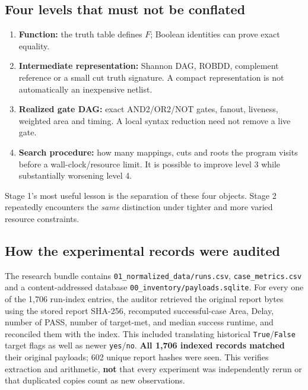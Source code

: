 \subsection{Four levels that must not be conflated}\label{four-levels-that-must-not-be-conflated}

\begin{enumerate}
\def\labelenumi{\arabic{enumi}.}
\tightlist
\item
  \textbf{Function:} the truth table defines \(F\); Boolean identities can prove exact equality.
\item
  \textbf{Intermediate representation:} Shannon DAG, ROBDD, complement reference or a small cut truth signature. A compact representation is not automatically an inexpensive netlist.
\item
  \textbf{Realized gate DAG:} exact AND2/OR2/NOT gates, fanout, liveness, weighted area and timing. A local syntax reduction need not remove a live gate.
\item
  \textbf{Search procedure:} how many mappings, cuts and roots the program visits before a wall-clock/resource limit. It is possible to improve level 3 while substantially worsening level 4.
\end{enumerate}

Stage 1's most useful lesson is the separation of these four objects. Stage 2 repeatedly encounters the \emph{same} distinction under tighter and more varied resource constraints.

\subsection{How the experimental records were audited}\label{how-the-experimental-records-were-audited}

The research bundle contains \texttt{01\_normalized\_data/runs.csv}, \texttt{case\_metrics.csv} and a content-addressed database \texttt{00\_inventory/payloads.sqlite}. For every one of the 1,706 run-index entries, the auditor retrieved the original report bytes using the stored report SHA-256, recomputed successful-case Area, Delay, number of PASS, number of target-met, and median success runtime, and reconciled them with the index. This included translating historical \texttt{True}/\texttt{False} target flags as well as newer \texttt{yes}/\texttt{no}. \textbf{All 1,706 indexed records matched} their original payloads; 602 unique report hashes were seen. This verifies extraction and arithmetic, \textbf{not} that every experiment was independently rerun or that duplicated copies count as new observations.

